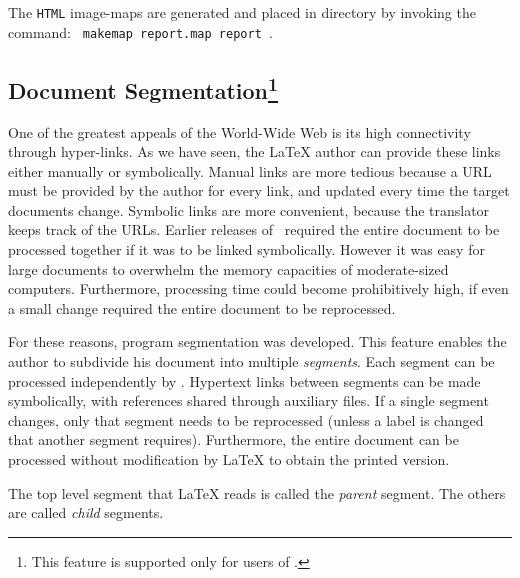 The \texttt{HTML} image-maps are generated and placed in directory
 by invoking the command: \verb| makemap report.map report |.%





\subsection{Document Segmentation\protect\footnote{This feature
is supported only for users of \LaTeXe.}\label{Segmentation}}%
\tableofchildlinks*\htmlrule
{}%
One of the greatest appeals of the World-Wide Web is its high
connectivity through hyper-links.  As we have seen, the \LaTeX{} 
author can provide these links either manually or symbolically.
Manual links are more tedious because a URL must be provided
by the author for every link, and updated every time the target
documents change.
%
Symbolic links are more convenient, 
because the translator keeps track of the URLs.  
Earlier releases of \latextohtml\ required the entire document 
to be processed together if it was to be linked symbolically.  
However it was easy for large documents to overwhelm 
the memory capacities of moderate-sized computers.  
Furthermore, processing time could become prohibitively high, 
if even a small change required the entire document to be reprocessed.

%
\html{\\}%
For these reasons, program segmentation was developed.
This feature enables the author to subdivide his document
into multiple \textit{segments}\label{segments}.
Each segment can be processed independently by \latextohtml.
Hypertext links between segments can be made symbolically,
with references shared through auxiliary files.  
If a single segment changes, only that segment needs to be reprocessed 
(unless a label is changed that another segment requires).  
Furthermore, the entire document can be processed 
without modification by \LaTeX{} to obtain the printed version.  

%
\html{\\}\noindent
The top level segment that \LaTeX{} reads is called the \emph{parent} segment.
\html{\\}
The others are called \emph{child} segments.

